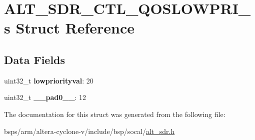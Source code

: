 \hypertarget{structALT__SDR__CTL__QOSLOWPRI__s}{}\section{A\+L\+T\+\_\+\+S\+D\+R\+\_\+\+C\+T\+L\+\_\+\+Q\+O\+S\+L\+O\+W\+P\+R\+I\+\_\+s Struct Reference}
\label{structALT__SDR__CTL__QOSLOWPRI__s}
\subsection*{Data Fields}
\begin{DoxyCompactItemize}
\item 
\mbox{\label{structALT__SDR__CTL__QOSLOWPRI__s_a1e49e780beb951189a3e8adb8b02fc79}} 
uint32\+\_\+t {\bfseries lowpriorityval}\+: 20
\item 
\mbox{\label{structALT__SDR__CTL__QOSLOWPRI__s_a3e74dad9f5dac256edface34545d42e6}} 
uint32\+\_\+t {\bfseries \+\_\+\+\_\+pad0\+\_\+\+\_\+}\+: 12
\end{DoxyCompactItemize}


The documentation for this struct was generated from the following file\+:\begin{DoxyCompactItemize}
\item 
bsps/arm/altera-\/cyclone-\/v/include/bsp/socal/\mbox{\hyperlink{alt__sdr_8h}{alt\+\_\+sdr.\+h}}\end{DoxyCompactItemize}
